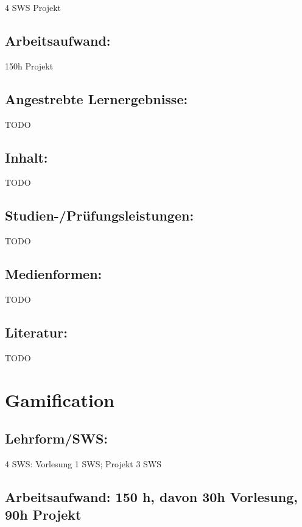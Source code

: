 4 SWS Projekt

\section*{Arbeitsaufwand:}\label{arbeitsaufwand-15}

150h Projekt

\section*{Angestrebte
Lernergebnisse:}\label{angestrebte-lernergebnisse-22}

TODO

\section*{Inhalt:}\label{inhalt-22}

TODO

\section*{Studien-/Prüfungsleistungen:}\label{studien-pruxfcfungsleistungen-17}

TODO

\section*{Medienformen:}\label{medienformen-11}

TODO

\section*{Literatur:}\label{literatur-18}

TODO

\chapter{Gamification}\label{gamification}

\section*{Lehrform/SWS:}\label{lehrformsws-19}

4 SWS: Vorlesung 1 SWS; Projekt 3 SWS

\section*{Arbeitsaufwand: 150 h, davon 30h Vorlesung, 90h
Projekt}\label{arbeitsaufwand-150-h-davon-30h-vorlesung-90h-projekt}

